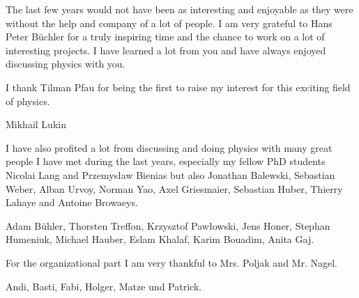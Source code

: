 
The last few years would not have been as interesting and enjoyable as they were without the help and company of a lot of people.
I am very grateful to Hans Peter Büchler for a truly inspiring time and the chance to work on a lot of interesting projects.
I have learned a lot from you and have always enjoyed discussing physics with you.

I thank Tilman Pfau for being the first to raise my interest for this exciting field of physics.

Mikhail Lukin

I have also profited a lot from discussing and doing physics with many great people I have met during the last years, especially my fellow PhD students Nicolai Lang and Przemysław Bienias but also Jonathan Balewski, Sebastian Weber, Alban Urvoy, Norman Yao, Axel Griesmaier, Sebastian Huber, Thierry Lahaye and Antoine Browaeys.

Adam Bühler, Thorsten Treffon, Krzysztof Pawłowski, Jens Honer, Stephan Humeniuk, Michael Hauber, Eslam Khalaf, Karim Bouadim, Anita Gaj.

For the organizational part I am very thankful to Mrs. Poljak and Mr. Nagel.

Andi, Basti, Fabi, Holger, Matze und Patrick.
